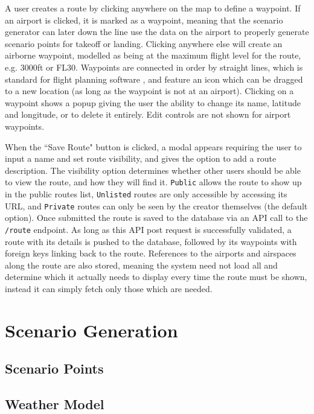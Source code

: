 A user creates a route by clicking anywhere on the map to define a waypoint. If an airport is clicked, it is marked as a waypoint, meaning that the scenario generator can later down the line use the data on the airport to properly generate scenario points for takeoff or landing. Clicking anywhere else will create an airborne waypoint, modelled as being at the maximum flight level for the route, e.g. 3000ft or FL30. Waypoints are connected in order by straight lines, which is standard for flight planning software \cite{SkyDemon}\cite{SkyVector}, and feature an icon which can be dragged to a new location (as long as the waypoint is not at an airport). Clicking on a waypoint shows a popup giving the user the ability to change its name, latitude and longitude, or to delete it entirely. Edit controls are not shown for airport waypoints.

When the ``Save Route" button is clicked, a modal appears requiring the user to input a name and set route visibility, and gives the option to add a route description. The visibility option determines whether other users should be able to view the route, and how they will find it. \texttt{Public} allows the route to show up in the public routes list, \texttt{Unlisted} routes are only accessible by accessing its URL, and \texttt{Private} routes can only be seen by the creator themselves (the default option). Once submitted the route is saved to the database via an API call to the \texttt{/route} endpoint. As long as this API post request is successfully validated, a route with its details is pushed to the database, followed by its waypoints with foreign keys linking back to the route. References to the airports and airspaces along the route are also stored, meaning the system need not load all and determine which it actually needs to display every time the route must be shown, instead it can simply fetch only those which are needed.

\section{Scenario Generation}
\label{se:scenariogen}

\subsection{Scenario Points}
\label{sse:scenariopoints}

\subsection{Weather Model}
\label{sse:metormodel}

